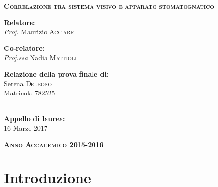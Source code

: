\documentclass [a4paper,11pt]{book}
\begin{document}
\begin{center}
{\Huge\textsc{\textbf{Correlazione tra sistema visivo e apparato stomatognatico }}\par}
\end{center}
\vfill
\large
\begin{flushleft}
\textbf{Relatore:}\\
\hspace*{2em}\textit{Prof.} Maurizio \textsc{Acciarri}
\end{flushleft}
\begin{flushleft}
\textbf{Co-relatore:}\\
\hspace*{2em}\textit{Prof.ssa} Nadia \textsc{Mattioli}\\
\end{flushleft}
\vskip 1cm
\begin{flushright}
\textbf{Relazione della prova finale di:}\\
\hspace*{2em}Serena \textsc{Delbono}\\
\hspace*{2em}Matricola 782525

\textbf{ \\ Appello di laurea:}\\
\hspace*{2em}16 Marzo 2017
\end{flushright}
\vfill
\begin{center}
\textsc{\textbf{Anno Accademico 2015-2016}}
\end{center}
\restoregeometry

\thispagestyle{empty}
\cleardoublepage
\newpage
\tableofcontents

\newpage
\listoffigures
\listoftables



\mainmatter
\chapter*{Introduzione}







\begin{appendices}

\end{appendices}


\end{document}
